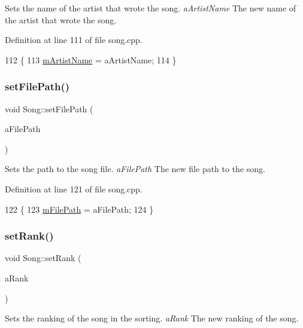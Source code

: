 Sets the name of the artist that wrote the song. {\itshape a\+Artist\+Name} The new name of the artist that wrote the song. 



Definition at line 111 of file song.\+cpp.


\begin{DoxyCode}
112 \{
113     \mbox{\hyperlink{class_song_a53eb13c6325e01434ee370ba2d9af292}{mArtistName}} = aArtistName;
114 \}
\end{DoxyCode}
\mbox{\label{class_song_ac2053f95eea7a3f96fb7d216e07637d7}} 
\subsubsection{\texorpdfstring{set\+File\+Path()}{setFilePath()}}
{\footnotesize\ttfamily void Song\+::set\+File\+Path (\begin{DoxyParamCaption}\item[{Q\+String}]{a\+File\+Path }\end{DoxyParamCaption})}



Sets the path to the song file. {\itshape a\+File\+Path} The new file path to the song. 



Definition at line 121 of file song.\+cpp.


\begin{DoxyCode}
122 \{
123     \mbox{\hyperlink{class_song_af6852312a9369340908b7726d97979a6}{mFilePath}} = aFilePath;
124 \}
\end{DoxyCode}
\mbox{\label{class_song_acbfe66b799c390ea11be07907835f057}} 
\subsubsection{\texorpdfstring{set\+Rank()}{setRank()}}
{\footnotesize\ttfamily void Song\+::set\+Rank (\begin{DoxyParamCaption}\item[{int}]{a\+Rank }\end{DoxyParamCaption})}



Sets the ranking of the song in the sorting. {\itshape a\+Rank} The new ranking of the song. 



